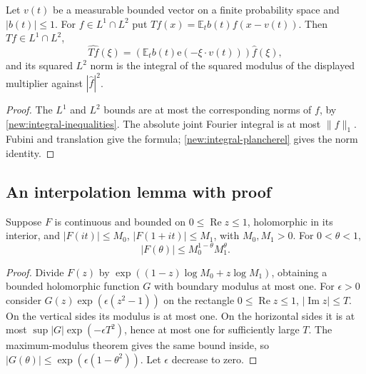 \documentclass[11pt]{article}
\theoremstyle{definition}
\newcommand{\ee}[1]{\mathrm e\!\left(#1\right)}
\begin{document}
\begin{lemma}\label{new:average-multiplier}
Let $v(t)$ be a measurable bounded vector on a finite probability space and $|b(t)|\leq1$.
For $f\in L^1\cap L^2$ put $Tf(x)=\mathbb E_t b(t)f(x-v(t))$. Then $Tf\in L^1\cap L^2$,
\[
 \widehat{Tf}(\xi)=\left(\mathbb E_t b(t)\ee{-\xi\cdot v(t)}\right)\widehat f(\xi),
\]
and its squared $L^2$ norm is the integral of the squared modulus of the displayed multiplier
against $|\widehat f|^2$.
\end{lemma}
\begin{proof}
The $L^1$ and $L^2$ bounds are at most the corresponding norms of $f$, by
\cref{new:integral-inequalities}. The absolute joint Fourier integral is at most $\|f\|_1$.
Fubini and translation give the formula; \cref{new:integral-plancherel} gives the norm identity.
\end{proof}

\subsection{An interpolation lemma with proof}
\begin{lemma}\label{new:three-lines}
Suppose $F$ is continuous and bounded on $0\leq\operatorname{Re}z\leq1$, holomorphic in
its interior, and $|F(it)|\leq M_0$, $|F(1+it)|\leq M_1$, with $M_0,M_1>0$.
For $0<\theta<1$,
\[
 |F(\theta)|\leq M_0^{1-\theta}M_1^\theta.
\]
\end{lemma}
\begin{proof}
Divide $F(z)$ by $\exp((1-z)\log M_0+z\log M_1)$, obtaining a bounded holomorphic function
$G$ with boundary modulus at most one. For $\epsilon>0$ consider
$G(z)\exp(\epsilon(z^2-1))$ on the rectangle $0\leq\operatorname{Re}z\leq1$,
$|\operatorname{Im}z|\leq T$. On the vertical sides its modulus is at most one. On the
horizontal sides it is at most $\sup|G|\exp(-\epsilon T^2)$, hence at most one for sufficiently
large $T$. The maximum-modulus theorem gives the same bound inside, so
$|G(\theta)|\leq\exp(\epsilon(1-\theta^2))$. Let $\epsilon$ decrease to zero.
\end{proof}
\end{document}
